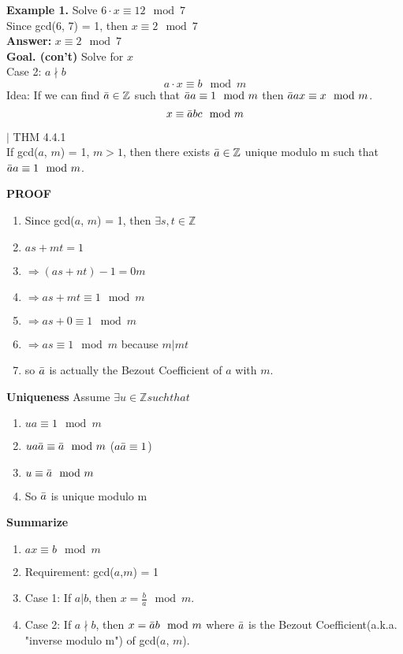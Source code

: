 \documentclass [12pt]{article}
\begin{document}
\pagebreak
\noindent\textbf{Example 1.} Solve $6\cdot x\equiv12\mod7$\\
\indent Since gcd(6, 7) = 1, then $x\equiv2\mod7$\\
\indent\textbf{Answer:} $x\equiv2\mod7$
\vspace{0.2in}\\
\noindent\textbf{Goal. (con't)} Solve for $x$\\
\indent Case 2: $a\nmid b$\\
\[a\cdot x \equiv b\mod m\]
\indent Idea: If we can find $\Bar{a}\in\mathbb{Z}$ such that $\Bar{a}a\equiv1\mod m$ then $\Bar{a}ax\equiv x\mod m$.
\[x\equiv \Bar{a}bc\mod m\]
\begin{framed}
\noindent$|$ THM 4.4.1\\
If gcd($a$, $m$) = 1, $m>1$, then there exists $\Bar{a}\in\mathbb{Z}$ unique modulo m such that $\Bar{a}a\equiv1\mod m$.
\end{framed}
\noindent\textbf{PROOF}
\begin{enumerate}[\indent]
    \item Since gcd($a$, $m$) = 1, then $\exists s,t\in\mathbb{Z}$
    \item$as+mt=1$
    \item\quad $\Rightarrow (as+nt) - 1 = 0m$
    \item\quad $\Rightarrow as + mt \equiv 1\mod m$
    \item\quad $\Rightarrow as + 0 \equiv 1\mod m$
    \item\quad $\Rightarrow as\equiv 1\mod m$ because $m|mt$
    \item so $\Bar{a}$ is actually the Bezout Coefficient of $a$ with $m$.
\end{enumerate}
\vspace{0.2in}
\noindent\textbf{Uniqueness} Assume $\exists u\in\mathbb{Z} such that$
\begin{enumerate}[\quad]
    \item\quad $ua\equiv 1\mod m$
    \item\quad $ua\Bar{a}\equiv\Bar{a}\mod m$ \quad ($a\Bar{a}\equiv 1$)
    \item\quad $u\equiv\Bar{a}\mod m$
    \item So $\Bar{a}$ is unique modulo m
\end{enumerate}
\vspace{0.2in}
\noindent\textbf{Summarize} 
\begin{enumerate}[\quad]
    \item$ax\equiv b\mod m$
    \item Requirement: gcd($a$,$m$) = 1
    \item Case 1: If $a|b$, then $x=\frac{b}{a}\mod m$.
    \item Case 2: If $a\nmid b$, then $x=\Bar{a}b\mod m$ where $\Bar{a}$ is the Bezout Coefficient(a.k.a. "inverse modulo m") of gcd($a$, $m$).
\end{enumerate}
\end{document}
